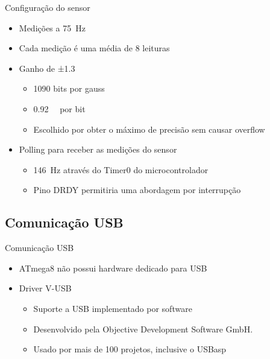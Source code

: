 \documentclass{beamer}
\begin{document}
\begin{frame}{Configuração do sensor}
	\begin{itemize}
		\pause
		\item Medições a \qty{75}{\hertz}
		\pause
		\item Cada medição é uma média de 8 leituras
		\pause
		\item Ganho de ±\qty{1.3}{\gauss}
		\pause
		\begin{itemize}
			\item \num{1090} bits por gauss
			\item \qty{0.92}{\milli\gauss} por bit
			\pause
			\item Escolhido por obter o máximo de precisão sem causar overflow
		\end{itemize}
		\pause
		\item Polling para receber as medições do sensor
		\begin{itemize}
			\pause
			\item \qty{146}{\hertz} através do Timer0 do microcontrolador
			\pause
			\item Pino DRDY permitiria uma abordagem por interrupção
		\end{itemize}
	\end{itemize}
\end{frame}



\subsection{Comunicação USB}

\begin{frame}{Comunicação USB}
	\begin{itemize}
		\pause
		\item ATmega8 não possui hardware dedicado para USB
		\pause
		\item Driver V-USB
		\begin{itemize}
			\item Suporte a USB implementado por software
			\pause
			\item Desenvolvido pela Objective Development Software GmbH.
			\pause
			\item Usado por mais de 100 projetos\pause, inclusive o USBasp
		\end{itemize}
	\end{itemize}
\end{frame}
\end{document}
